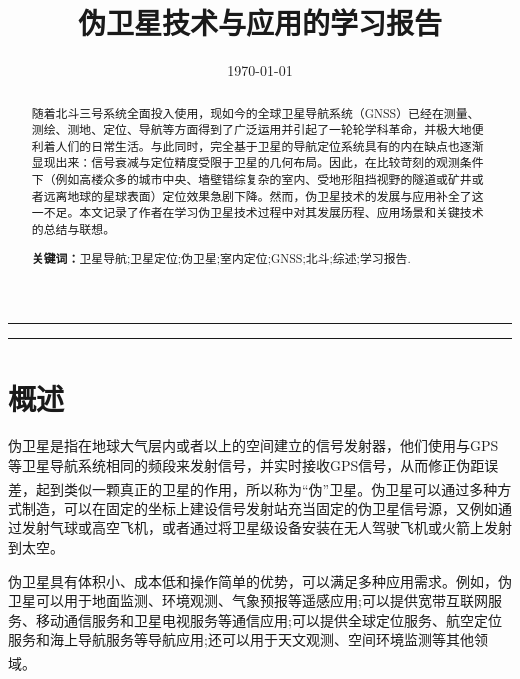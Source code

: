 \documentclass[12pt, a4paper, oneside]{ctexart}
\title{\textbf{伪卫星技术与应用的学习报告}}
\date{\today}
\newcommand{\upcite}[1]{\textsuperscript{\cite{#1}}}
\begin{document}
\maketitle

\setcounter{page}{1}
\maketitle
\thispagestyle{empty}
\begin{center}
    \rule[-10pt]{16cm}{0.05em}
\end{center}%
\begin{abstract}
    随着北斗三号系统全面投入使用，现如今的全球卫星导航系统（GNSS）已经在测量、测绘、测地、定位、导航等方面得到了广泛运用并引起了一轮轮学科革命，并极大地便利着人们的日常生活。与此同时，完全基于卫星的导航定位系统具有的内在缺点也逐渐显现出来：信号衰减与定位精度受限于卫星的几何布局。因此，在比较苛刻的观测条件下（例如高楼众多的城市中央、墙壁错综复杂的室内、受地形阻挡视野的隧道或矿井或者远离地球的星球表面）定位效果急剧下降。然而，伪卫星技术的发展与应用补全了这一不足。本文记录了作者在学习伪卫星技术过程中对其发展历程、应用场景和关键技术的总结与联想。
    \par\textbf{关键词：}卫星导航;卫星定位;伪卫星;室内定位;GNSS;北斗;综述;学习报告. 
\end{abstract}
\begin{center}
    \rule[-10pt]{16cm}{0.05em}
\end{center}%
\section{概述}

伪卫星是指在地球大气层内或者以上的空间建立的信号发射器，他们使用与GPS等卫星导航系统相同的频段来发射信号，并实时接收GPS信号，从而修正伪距误差，起到类似一颗真正的卫星的作用，所以称为“伪”卫星。\upcite{07}伪卫星可以通过多种方式制造，可以在固定的坐标上建设信号发射站充当固定的伪卫星信号源，又例如通过发射气球或高空飞机，或者通过将卫星级设备安装在无人驾驶飞机或火箭上发射到太空。

伪卫星具有体积小、成本低和操作简单的优势，可以满足多种应用需求。例如，伪卫星可以用于地面监测、环境观测、气象预报等遥感应用;可以提供宽带互联网服务、移动通信服务和卫星电视服务等通信应用;可以提供全球定位服务、航空定位服务和海上导航服务等导航应用;还可以用于天文观测、空间环境监测等其他领域。\upcite{05,07}
\end{document}
